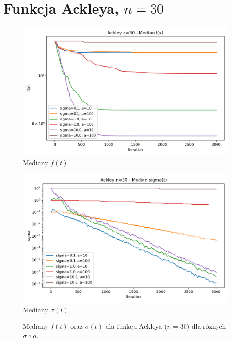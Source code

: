 \documentclass[a4paper,12pt]{article}
\begin{document}
\section{Funkcja Ackleya, $n=30$}
\begin{figure}[H]
    \centering
    \begin{minipage}{0.48\textwidth}
        \centering
        \includegraphics[width=\textwidth]{charts/Ackley_n30_all_medians.png}\\
        \small Mediany $f(t)$
    \end{minipage}\hfill
    \begin{minipage}{0.48\textwidth}
        \centering
        \includegraphics[width=\textwidth]{charts/Ackley_n30_all_sigmas.png}\\
        \small Mediany $\sigma(t)$
    \end{minipage}
    \caption{Mediany $f(t)$ oraz $\sigma(t)$ dla funkcji Ackleya ($n=30$) dla różnych $\sigma$ i $a$.}
\end{figure}
\end{document}
